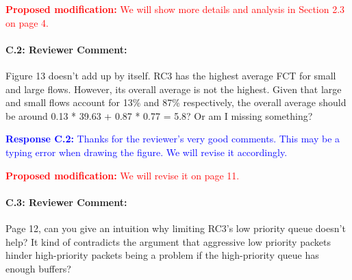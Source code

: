 \documentclass[12pt,one-column]{article}
\begin{document}
\noindent\textcolor{red}{\textbf{Proposed modification: }
We will show more details and analysis in Section 2.3 on page 4.
}

{\it \paragraph{C.2: Reviewer Comment:} Figure 13 doesn’t add up by itself. RC3 has the highest average FCT for small and large flows. However, its overall average is not the highest. Given that large and small flows account for 13\% and 87\% respectively, the overall average should be around 0.13 * 39.63 + 0.87 * 0.77 = 5.8? Or am I missing something?}


\noindent\textcolor{blue}{\textbf{Response C.2:}
Thanks for the reviewer’s very good comments. 
This may be a typing error when drawing the figure.
We will revise it accordingly.
}

\noindent\textcolor{red}{\textbf{Proposed modification: }
We will revise it on page 11.
}

{\it \paragraph{C.3: Reviewer Comment:} Page 12, can you give an intuition why limiting RC3’s low priority queue doesn’t help? It kind of contradicts the argument that aggressive low priority packets hinder high-priority packets being a problem if the high-priority queue has enough buffers?}
\end{document}
